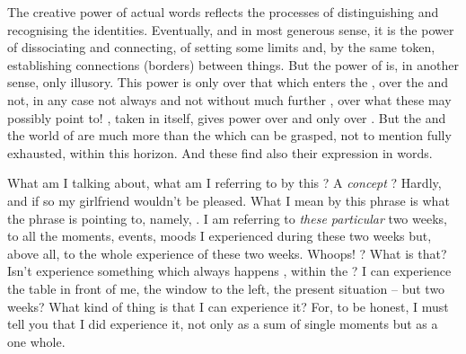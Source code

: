 \pa\label{pa:wordsPowerC} The creative power of actual words reflects the processes of
distinguishing and recognising the identities. Eventually, and in most generous
sense, it is the power of dissociating and connecting, of setting some
 limits and, by the same token, establishing connections (borders)
between things. But the power of  is, in another sense, only
illusory. This power is only over that which enters the \hoa, over the
 and not, in any case not always and not without much further
, over what these  may possibly point to! ,
taken in itself, gives power over  and only over .
But the  and the world of
 are much more than the  which can be grasped,
not to mention fully exhausted, within this horizon. And these 
find also their expression in words.



\pa\label{twoweeks}
 What am I talking about,
what am I referring to by this ? A {\em concept} ?
Hardly, and if so my girlfriend wouldn't be pleased. What I mean by
this phrase is what the phrase is pointing to, namely, .  I
am referring to {\em these particular} two weeks, to all the moments, events,
moods I experienced during these two weeks but, above all, to the whole
experience of these two weeks. Whoops! ? What is
that? Isn't experience something which always happens \herenow, within the
\hoa? I can experience the table in front of me, the window to
the left, the present situation -- but two weeks? What kind of thing is  that I can 
experience it? For, to be honest, I must tell you that I did experience it, not
only as a sum of single moments but as a one whole.

